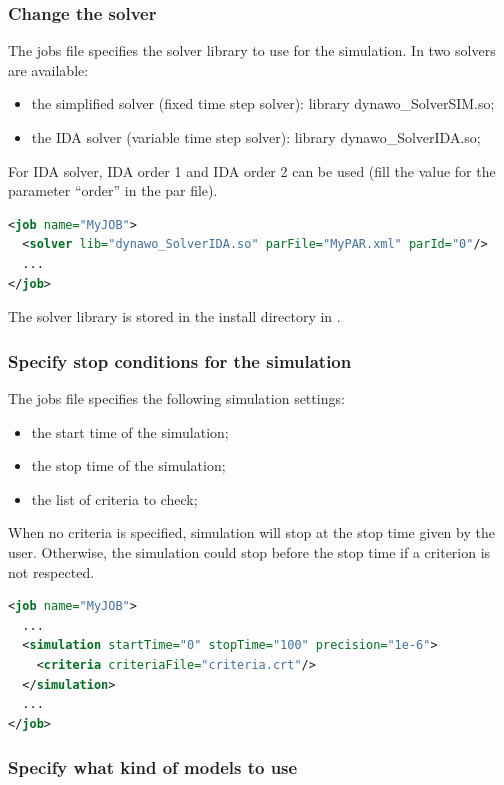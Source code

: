 \documentclass[a4paper, 12pt]{report}
\begin{document}
\subsubsection{Change the solver}

The jobs file specifies the solver library to use for the simulation. In \Dynawo two solvers are available:
\begin{itemize}
\item the simplified solver (fixed time step solver): library dynawo\_SolverSIM.so;
\item the IDA solver (variable time step solver): library dynawo\_SolverIDA.so;
\end{itemize}

For IDA solver, IDA order 1 and IDA order 2 can be used (fill the value for the parameter ``order'' in the par file).

\begin{lstlisting}[language=XML, morekeywords={lib}]
<job name="MyJOB">
  <solver lib="dynawo_SolverIDA.so" parFile="MyPAR.xml" parId="0"/>
  ...
</job>
\end{lstlisting}

The solver library is stored in the install directory in .

\subsubsection{Specify stop conditions for the simulation}

The jobs file specifies the following simulation settings:
\begin{itemize}
\item the start time of the simulation;
\item the stop time of the simulation;
\item the list of criteria to check;
\end{itemize}

When no criteria is specified, simulation will stop at the stop time given by
the user. Otherwise, the simulation could stop before the stop
time if a criterion is not respected.

\begin{lstlisting}[language=XML, morekeywords={activateCriteria}]
<job name="MyJOB">
  ...
  <simulation startTime="0" stopTime="100" precision="1e-6">
    <criteria criteriaFile="criteria.crt"/>
  </simulation>
  ...
</job>
\end{lstlisting}

\subsubsection{Specify what kind of models to use}
\end{document}
